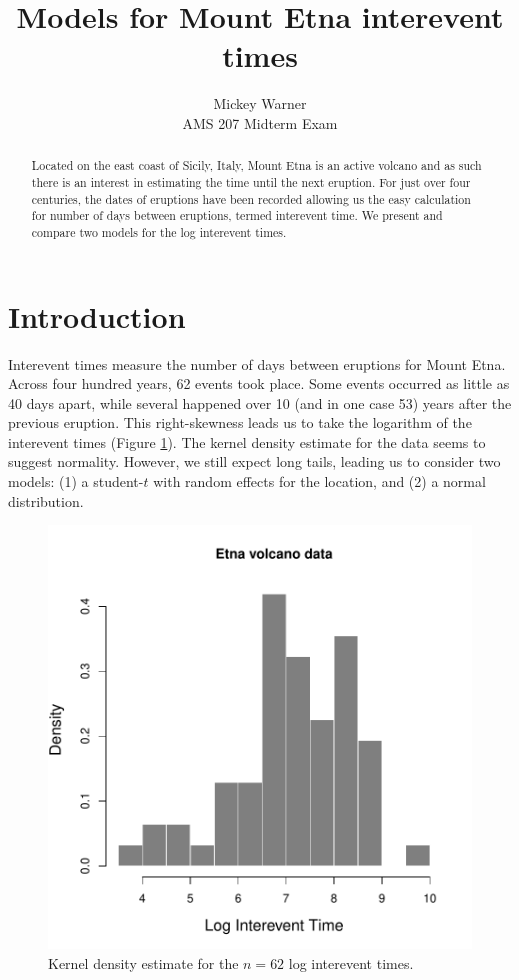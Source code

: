 \documentclass{asaproc}
\title{Models for Mount Etna interevent times}
\author{Mickey Warner \\ AMS 207 Midterm Exam}
\begin{document}
\maketitle


\begin{abstract}
Located on the east coast of Sicily, Italy, Mount Etna is an active volcano and as such there is an interest in estimating the time until the next eruption. For just over four centuries, the dates of eruptions have been recorded allowing us the easy calculation for number of days between eruptions, termed interevent time. We present and compare two models for the log interevent times.
\end{abstract}

\section{Introduction}
Interevent times measure the number of days between eruptions for Mount Etna. Across four hundred years, 62 events took place. Some events occurred as little as 40 days apart, while several happened over 10 (and in one case 53) years after the previous eruption. This right-skewness leads us to take the logarithm of the interevent times (Figure \ref{data}). The kernel density estimate for the data seems to suggest normality. However, we still expect long tails, leading us to consider two models: (1) a student-$t$ with random effects for the location, and (2) a normal distribution.
\begin{figure}[ht]
\centering
\includegraphics[scale=0.55]{figs/data.pdf}
\caption{Kernel density estimate for the $n=62$ log interevent times.}
\label{data}
\end{figure}
\end{document}
